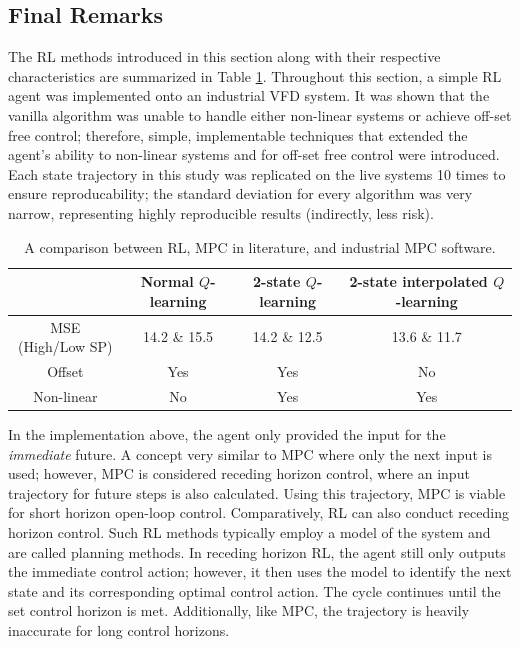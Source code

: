 \subsection{Final Remarks}
The RL methods introduced in this section along with their respective characteristics are summarized in Table \ref{tab:system1_info}. Throughout this section, a simple RL agent was implemented onto an industrial VFD system. It was shown that the vanilla algorithm was unable to handle either non-linear systems or achieve off-set free control; therefore, simple, implementable techniques that extended the agent's ability to non-linear systems and for off-set free control were introduced. Each state trajectory in this study was replicated on the live systems 10 times to ensure reproducability; the standard deviation for every algorithm was very narrow, representing highly reproducible results (indirectly, less risk).

\begin{table}[H]
\caption{A comparison between RL, MPC in literature, and industrial MPC software.}
\label{tab:system1_info}
\centering
{\scriptsize
\begin{tabular}{c|c|c|c}
 & \textbf{Normal $Q$-learning}	& \textbf{2-state $Q$-learning} & \textbf{2-state interpolated $Q$-learning}\\
 \hline
MSE (High/Low SP)   & 14.2 \& 15.5	& 14.2 \& 12.5   &  13.6 \& 11.7 \\
Offset		& Yes			&  Yes   &  No \\
Non-linear		& No			& Yes   &  Yes \\
\end{tabular}}
\end{table}

In the implementation above, the agent only provided the input for the \textit{immediate} future. A concept very similar to MPC where only the next input is used; however, MPC is considered receding horizon control, where an input trajectory for future steps is also calculated.  Using this trajectory, MPC is viable for short horizon open-loop control.  Comparatively, RL can also conduct receding horizon control. Such RL methods typically employ a model of the system and are called planning methods.  In receding horizon RL, the agent still only outputs the immediate control action; however, it then uses the model to identify the next state and its corresponding optimal control action. The cycle continues until the set control horizon is met.  Additionally, like MPC, the trajectory is heavily inaccurate for long control horizons.

